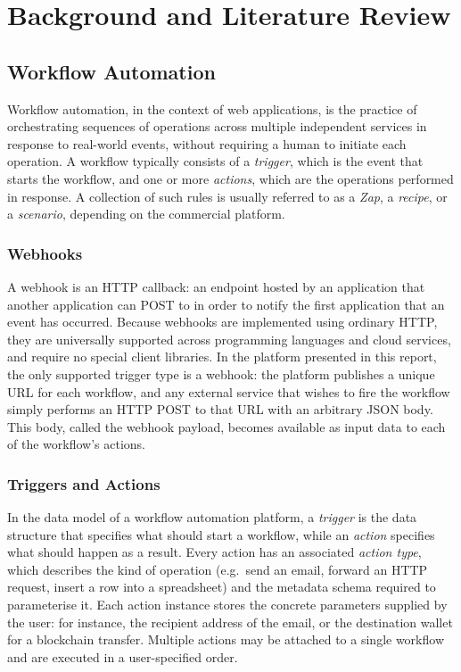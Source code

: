 \chapter{Background and Literature Review}

\section{Workflow Automation}

Workflow automation, in the context of web applications, is the practice of orchestrating sequences of operations across multiple independent services in response to real-world events, without requiring a human to initiate each operation. A workflow typically consists of a \emph{trigger}, which is the event that starts the workflow, and one or more \emph{actions}, which are the operations performed in response. A collection of such rules is usually referred to as a \emph{Zap}, a \emph{recipe}, or a \emph{scenario}, depending on the commercial platform.

\subsection{Webhooks}

A webhook is an HTTP callback: an endpoint hosted by an application that another application can POST to in order to notify the first application that an event has occurred. Because webhooks are implemented using ordinary HTTP, they are universally supported across programming languages and cloud services, and require no special client libraries. In the platform presented in this report, the only supported trigger type is a webhook: the platform publishes a unique URL for each workflow, and any external service that wishes to fire the workflow simply performs an HTTP POST to that URL with an arbitrary JSON body. This body, called the webhook payload, becomes available as input data to each of the workflow's actions.

\subsection{Triggers and Actions}

In the data model of a workflow automation platform, a \emph{trigger} is the data structure that specifies what should start a workflow, while an \emph{action} specifies what should happen as a result. Every action has an associated \emph{action type}, which describes the kind of operation (e.g.\ send an email, forward an HTTP request, insert a row into a spreadsheet) and the metadata schema required to parameterise it. Each action instance stores the concrete parameters supplied by the user: for instance, the recipient address of the email, or the destination wallet for a blockchain transfer. Multiple actions may be attached to a single workflow and are executed in a user-specified order.

